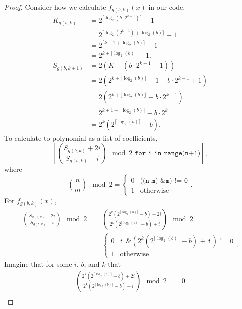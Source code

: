 \documentclass[a4paper]{article}
\begin{document}
	\begin{proof}
		Consider how we calculate $f_{g(b,k)}(x)$ in our code.
		\begin{align*}
			K_{g(b,k)} &= 2^{\lceil \log_2{\left(b\cdot2^{k-1}\right)} \rceil} - 1 \\
				&= 2^{\lceil \log_2{\left(2^{k-1}\right)}+ \log_2{(b)} \rceil} - 1 \\
				&= 2^{\lceil k-1 + \log_2{(b)} \rceil} - 1 \\
				&= 2^{k + \lfloor \log_2{(b)} \rfloor} - 1. \\
			S_{g(b,k+1)} &= 2\left(K - \left(b\cdot2^{k-1} - 1\right)\right) \\
				&= 2\left(2^{k + \lfloor \log_2{(b)} \rfloor} - 1 - b\cdot2^{k-1}+1\right) \\
				&= 2\left(2^{k + \lfloor \log_2{(b)} \rfloor} - b\cdot2^{k-1}\right) \\
				&= 2^{k+1+\lfloor\log_2{(b)}\rfloor} - b\cdot2^{k} \\
				&= 2^{k}\left(2^{\lceil \log_2{(b)}\rceil} - b\right).
		\end{align*}
		To calculate to polynomial as a list of coefficients,
		\begin{equation*}
			\left[\binom{S_{g(b,k)} + 2i}{S_{g(b,k)} + i} \mod 2 \texttt{ for i in range(n+1)} \right],
		\end{equation*}
		where
		\begin{equation*}
			\binom{n}{m} \mod 2 = \begin{cases}
				0 & \texttt{((n-m) \& m) != 0} \\
				1 & \text{otherwise}
			\end{cases}.
		\end{equation*}
		For $f_{g(b,k)}(x)$,
		\begin{align*}
			\binom{S_{g(b,k)}+2i}{S_{g(b,k)}+i} \mod 2 &= \binom{2^{k}\left(2^{\lceil \log_2{(b)}\rceil} - b\right) + 2i}{2^{k}\left(2^{\lceil \log_2{(b)}\rceil} - b\right) + i} \mod 2 \\
			&= \begin{cases}
				0 & \texttt{i \& }\left(2^{k}\left(2^{\lceil \log_2{(b)}\rceil} - b\right) \texttt{ + i}\right)\texttt{ != 0} \\
				1 & \text{otherwise}
			\end{cases}.
		\end{align*}
		Imagine that for some $i$, $b$, and $k$ that
		\begin{align*}
			\binom{2^{k}\left(2^{\lceil \log_2{(b)}\rceil} - b\right) + 2i}{2^{k}\left(2^{\lceil \log_2{(b)}\rceil} - b\right) + i} \mod 2 &= 0 \\

\end{align*}
\end{proof}
\end{document}

